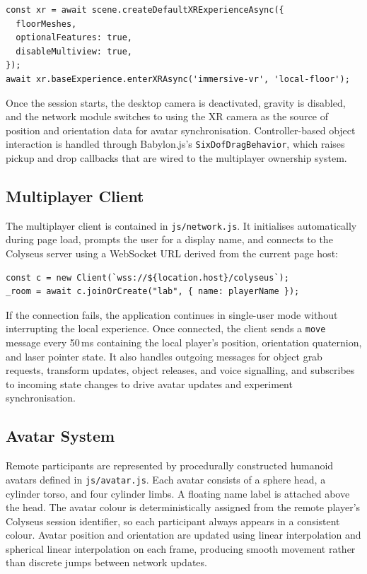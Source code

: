 \begin{verbatim}
const xr = await scene.createDefaultXRExperienceAsync({
  floorMeshes,
  optionalFeatures: true,
  disableMultiview: true,
});
await xr.baseExperience.enterXRAsync('immersive-vr', 'local-floor');
\end{verbatim}

Once the session starts, the desktop camera is deactivated, gravity is
disabled, and the network module switches to using the XR camera as the
source of position and orientation data for avatar synchronisation.
Controller-based object interaction is handled through Babylon.js's
\texttt{SixDofDragBehavior}, which raises pickup and drop callbacks that
are wired to the multiplayer ownership system.

\subsection{Multiplayer Client}
\label{sec:multiplayer_client}

The multiplayer client is contained in \texttt{js/network.js}. It
initialises automatically during page load, prompts the user for a display
name, and connects to the Colyseus server using a WebSocket URL derived
from the current page host:

\begin{verbatim}
const c = new Client(`wss://${location.host}/colyseus`);
_room = await c.joinOrCreate("lab", { name: playerName });
\end{verbatim}

If the connection fails, the application continues in single-user mode
without interrupting the local experience. Once connected, the client
sends a \texttt{move} message every 50\,ms containing the local player's
position, orientation quaternion, and laser pointer state. It also handles
outgoing messages for object grab requests, transform updates, object
releases, and voice signalling, and subscribes to incoming state changes
to drive avatar updates and experiment synchronisation.

\subsection{Avatar System}
\label{sec:avatar_system}

Remote participants are represented by procedurally constructed humanoid
avatars defined in \texttt{js/avatar.js}. Each avatar consists of a sphere
head, a cylinder torso, and four cylinder limbs. A floating name label is
attached above the head. The avatar colour is deterministically assigned
from the remote player's Colyseus session identifier, so each participant
always appears in a consistent colour. Avatar position and orientation are
updated using linear interpolation and spherical linear interpolation on
each frame, producing smooth movement rather than discrete jumps between
network updates.


